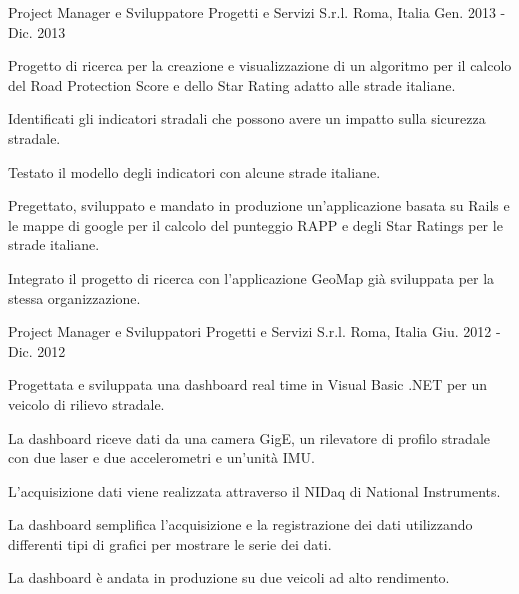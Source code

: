 \begin{cventries}
  \cventry
    {Project Manager e Sviluppatore} %
    {Progetti e Servizi S.r.l.} %
    {Roma, Italia} %
    {Gen. 2013 - Dic. 2013} %
    {
      \begin{cvitems} %
        \item {Progetto di ricerca per la creazione e visualizzazione di un algoritmo per il calcolo del Road Protection Score e dello Star Rating adatto alle strade italiane.}
        \item {Identificati gli indicatori stradali che possono avere un impatto sulla sicurezza stradale.}
        \item {Testato il modello degli indicatori con alcune strade italiane.}
        \item {Pregettato, sviluppato e mandato in produzione un'applicazione basata su Rails e le mappe di google per il calcolo del punteggio RAPP e degli Star Ratings per le strade italiane.}
        \item {Integrato il progetto di ricerca con l'applicazione GeoMap già sviluppata per la stessa organizzazione.}
      \end{cvitems}
    }

  \cventry
    {Project Manager e Sviluppatori} %
    {Progetti e Servizi S.r.l.} %
    {Roma, Italia} %
    {Giu. 2012 - Dic. 2012} %
    {
      \begin{cvitems} %
        \item {Progettata e sviluppata una dashboard real time in Visual Basic .NET per un veicolo di rilievo stradale.}
        \item {La dashboard riceve dati da una camera GigE, un rilevatore di profilo stradale con due laser e due accelerometri e un'unità IMU.}
        \item {L'acquisizione dati viene realizzata attraverso il NIDaq di National Instruments.}
        \item {La dashboard semplifica l'acquisizione e la registrazione dei dati utilizzando differenti tipi di grafici per mostrare le serie dei dati.}
        \item {La dashboard è andata in produzione su due veicoli ad alto rendimento.}
      \end{cvitems}
    }


\end{cventries}
